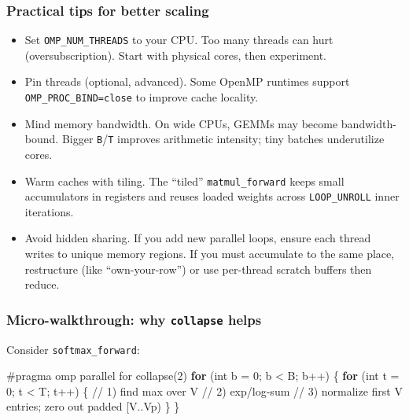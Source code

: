 \documentclass[
  letterpaper,
  DIV=11,
  numbers=noendperiod]{scrreprt}
\newenvironment{Shaded}{\begin{snugshade}}{\end{snugshade}}
\newcommand{\CommentTok}[1]{\textcolor[rgb]{0.37,0.37,0.37}{#1}}
\newcommand{\ControlFlowTok}[1]{\textcolor[rgb]{0.00,0.23,0.31}{\textbf{#1}}}
\newcommand{\DataTypeTok}[1]{\textcolor[rgb]{0.68,0.00,0.00}{#1}}
\newcommand{\DecValTok}[1]{\textcolor[rgb]{0.68,0.00,0.00}{#1}}
\newcommand{\NormalTok}[1]{\textcolor[rgb]{0.00,0.23,0.31}{#1}}
\newcommand{\OperatorTok}[1]{\textcolor[rgb]{0.37,0.37,0.37}{#1}}
\newcommand{\PreprocessorTok}[1]{\textcolor[rgb]{0.68,0.00,0.00}{#1}}
\providecommand{\tightlist}{%
  \setlength{\itemsep}{0pt}\setlength{\parskip}{0pt}}
\begin{document}
\subsubsection{Practical tips for better
scaling}\label{practical-tips-for-better-scaling}

\begin{itemize}
\tightlist
\item
  Set \texttt{OMP\_NUM\_THREADS} to your CPU. Too many threads can hurt
  (oversubscription). Start with physical cores, then experiment.
\item
  Pin threads (optional, advanced). Some OpenMP runtimes support
  \texttt{OMP\_PROC\_BIND=close} to improve cache locality.
\item
  Mind memory bandwidth. On wide CPUs, GEMMs may become bandwidth-bound.
  Bigger \texttt{B}/\texttt{T} improves arithmetic intensity; tiny
  batches underutilize cores.
\item
  Warm caches with tiling. The ``tiled'' \texttt{matmul\_forward} keeps
  small accumulators in registers and reuses loaded weights across
  \texttt{LOOP\_UNROLL} inner iterations.
\item
  Avoid hidden sharing. If you add new parallel loops, ensure each
  thread writes to unique memory regions. If you must accumulate to the
  same place, restructure (like ``own-your-row'') or use per-thread
  scratch buffers then reduce.
\end{itemize}

\subsubsection{\texorpdfstring{Micro-walkthrough: why \texttt{collapse}
helps}{Micro-walkthrough: why collapse helps}}\label{micro-walkthrough-why-collapse-helps}

Consider \texttt{softmax\_forward}:

\begin{Shaded}
\begin{Highlighting}[]
\PreprocessorTok{\#pragma omp parallel for collapse(2)}
\ControlFlowTok{for} \OperatorTok{(}\DataTypeTok{int}\NormalTok{ b }\OperatorTok{=} \DecValTok{0}\OperatorTok{;}\NormalTok{ b }\OperatorTok{\textless{}}\NormalTok{ B}\OperatorTok{;}\NormalTok{ b}\OperatorTok{++)} \OperatorTok{\{}
    \ControlFlowTok{for} \OperatorTok{(}\DataTypeTok{int}\NormalTok{ t }\OperatorTok{=} \DecValTok{0}\OperatorTok{;}\NormalTok{ t }\OperatorTok{\textless{}}\NormalTok{ T}\OperatorTok{;}\NormalTok{ t}\OperatorTok{++)} \OperatorTok{\{}
        \CommentTok{// 1) find max over V}
        \CommentTok{// 2) exp/log{-}sum}
        \CommentTok{// 3) normalize first V entries; zero out padded [V..Vp)}
    \OperatorTok{\}}
\OperatorTok{\}}
\end{Highlighting}
\end{Shaded}
\end{document}

